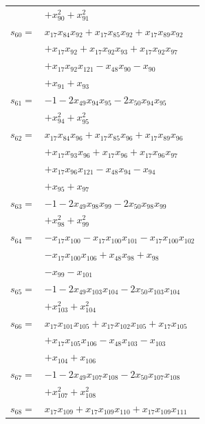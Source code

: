 \begin{longtable}{@{}r@{\;}l@{}}
 & \(\displaystyle +x_{90}^{2} +x_{91}^{2}\) \\[3pt]
\(s_{60}=\) & \(\displaystyle x_{17}x_{84}x_{92} +x_{17}x_{85}x_{92} +x_{17}x_{89}x_{92}\) \\
 & \(\displaystyle +x_{17}x_{92} +x_{17}x_{92}x_{93} +x_{17}x_{92}x_{97}\) \\
 & \(\displaystyle +x_{17}x_{92}x_{121} -x_{48}x_{90} -x_{90}\) \\
 & \(\displaystyle +x_{91} +x_{93}\) \\[3pt]
\(s_{61}=\) & \(\displaystyle -1 -2x_{49}x_{94}x_{95} -2x_{50}x_{94}x_{95}\) \\
 & \(\displaystyle +x_{94}^{2} +x_{95}^{2}\) \\[3pt]
\(s_{62}=\) & \(\displaystyle x_{17}x_{84}x_{96} +x_{17}x_{85}x_{96} +x_{17}x_{89}x_{96}\) \\
 & \(\displaystyle +x_{17}x_{93}x_{96} +x_{17}x_{96} +x_{17}x_{96}x_{97}\) \\
 & \(\displaystyle +x_{17}x_{96}x_{121} -x_{48}x_{94} -x_{94}\) \\
 & \(\displaystyle +x_{95} +x_{97}\) \\[3pt]
\(s_{63}=\) & \(\displaystyle -1 -2x_{49}x_{98}x_{99} -2x_{50}x_{98}x_{99}\) \\
 & \(\displaystyle +x_{98}^{2} +x_{99}^{2}\) \\[3pt]
\(s_{64}=\) & \(\displaystyle -x_{17}x_{100} -x_{17}x_{100}x_{101} -x_{17}x_{100}x_{102}\) \\
 & \(\displaystyle -x_{17}x_{100}x_{106} +x_{48}x_{98} +x_{98}\) \\
 & \(\displaystyle -x_{99} -x_{101}\) \\[3pt]
\(s_{65}=\) & \(\displaystyle -1 -2x_{49}x_{103}x_{104} -2x_{50}x_{103}x_{104}\) \\
 & \(\displaystyle +x_{103}^{2} +x_{104}^{2}\) \\[3pt]
\(s_{66}=\) & \(\displaystyle x_{17}x_{101}x_{105} +x_{17}x_{102}x_{105} +x_{17}x_{105}\) \\
 & \(\displaystyle +x_{17}x_{105}x_{106} -x_{48}x_{103} -x_{103}\) \\
 & \(\displaystyle +x_{104} +x_{106}\) \\[3pt]
\(s_{67}=\) & \(\displaystyle -1 -2x_{49}x_{107}x_{108} -2x_{50}x_{107}x_{108}\) \\
 & \(\displaystyle +x_{107}^{2} +x_{108}^{2}\) \\[3pt]
\(s_{68}=\) & \(\displaystyle x_{17}x_{109} +x_{17}x_{109}x_{110} +x_{17}x_{109}x_{111}\) \\

\end{longtable}
